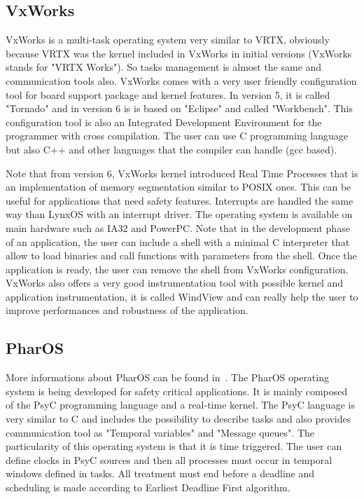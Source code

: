 \documentclass[10pt]{report}
\begin{document}
\subsection{VxWorks}

VxWorks is a multi-task operating system very similar to VRTX, obviously because VRTX was the kernel included in VxWorks in
initial versions (VxWorks stands for "VRTX Works"). So tasks management is almost the same and communication tools also.
VxWorks comes with a very user friendly configuration tool for board support package and kernel features. In version 5, it is
called "Tornado" and in version 6 is is based on "Eclipse" and called "Workbench". This configuration tool is also an
Integrated Development Environment for the programmer with cross compilation. The user can use C programming language but also
C++ and other languages that the compiler can handle (gcc based).

Note that from version 6, VxWorks kernel introduced Real Time Processes that is an implementation of memory segmentation
similar to POSIX ones. This can be useful for applications that need safety features. Interrupts are handled the same way
than LynxOS with an interrupt driver. The operating system is available on main hardware such as IA32 and PowerPC. Note that
in the development phase of an application, the user can include a shell with a minimal C interpreter that allow to load
binaries and call functions with parameters from the shell. Once the application is ready, the user can remove the shell from
VxWorks configuration. VxWorks also offers a very good instrumentation tool with possible kernel and application instrumentation,
it is called WindView and can really help the user to improve performances and robustness of the application.

\subsection{PharOS}

More informations about PharOS can be found in~\cite{OASIS:98}. The PharOS operating system is being developed for safety critical
applications. It is mainly composed of the PsyC programming language and a real-time kernel. The PsyC language is very similar to C and
includes the possibility to describe tasks and also provides communication tool as "Temporal variables" and "Message queues".
The particularity of this operating system is that it is time triggered. The user can define clocks in PsyC sources and then all
processes must occur in temporal windows defined in tasks. All treatment must end before a deadline and scheduling is made according
to Earliest Deadline First algorithm.
\end{document}
